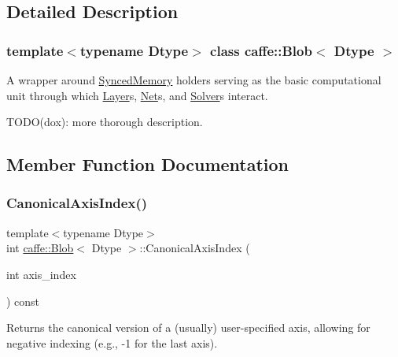 \subsection{Detailed Description}
\subsubsection*{template$<$typename Dtype$>$\newline
class caffe\+::\+Blob$<$ Dtype $>$}

A wrapper around \mbox{\hyperlink{classcaffe_1_1_synced_memory}{Synced\+Memory}} holders serving as the basic computational unit through which \mbox{\hyperlink{classcaffe_1_1_layer}{Layer}}s, \mbox{\hyperlink{classcaffe_1_1_net}{Net}}s, and \mbox{\hyperlink{classcaffe_1_1_solver}{Solver}}s interact. 

T\+O\+D\+O(dox)\+: more thorough description. 

\subsection{Member Function Documentation}
\mbox{\label{classcaffe_1_1_blob_ad686f5ed9994046f2c741bfa81118509}} 
\subsubsection{\texorpdfstring{Canonical\+Axis\+Index()}{CanonicalAxisIndex()}\hspace{0.1cm}{\footnotesize\ttfamily [1/2]}}
{\footnotesize\ttfamily template$<$typename Dtype$>$ \\
int \mbox{\hyperlink{classcaffe_1_1_blob}{caffe\+::\+Blob}}$<$ Dtype $>$\+::Canonical\+Axis\+Index (\begin{DoxyParamCaption}\item[{int}]{axis\+\_\+index }\end{DoxyParamCaption}) const\hspace{0.3cm}{\ttfamily [inline]}}



Returns the \textquotesingle{}canonical\textquotesingle{} version of a (usually) user-\/specified axis, allowing for negative indexing (e.\+g., -\/1 for the last axis). 


